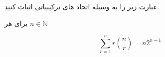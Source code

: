 \exercise
عبارت زیر را به وسیله اتحاد های ترکیبیاتی اثبات کنید.

برای هر
$n \in \mathbb{N}$

$$\sum_{r=1}^{n}r\binom{n}{r} = n 2^{n-1}$$
